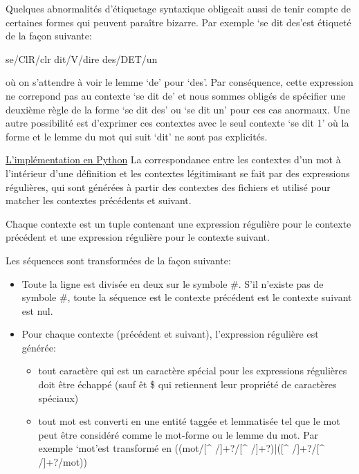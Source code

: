 Quelques abnormalités d'étiquetage syntaxique obligeait aussi de tenir compte de certaines formes qui peuvent paraître bizarre. Par exemple \lq{se dit des}\rq est étiqueté de la façon suivante:

\begin{framed}
se/ClR/clr dit/V/dire des/DET/un
\end{framed}

où on s'attendre à voir le lemme \lq{de}\rq{} pour \lq{des}\rq{}. Par conséquence, cette expression ne correpond pas au contexte \lq{se dit de}\rq{} et nous sommes obligés de spécifier une deuxième règle de la forme \lq{se dit des}\rq{} ou \lq{se dit un}\rq{} pour ces cas anormaux. Une autre possibilité est d'exprimer ces contextes avec le seul contexte \lq{se dit 1}\rq{} où la forme et le lemme du mot qui suit \lq{dit}\rq{} ne sont pas explicités.

\underline{L'implémentation en Python}\newline
La correspondance entre les contextes d'un mot à l'intérieur d'une définition et 
les contextes légitimisant se fait par des expressions régulières, qui sont 
générées à partir des contextes des fichiers et utilisé pour matcher les contextes
précédents et suivant.

Chaque contexte est un tuple contenant une expression régulière pour le contexte 
précédent et une expression régulière pour le contexte suivant.

Les séquences sont transformées de la façon suivante:
\begin{itemize}
    \item{Toute la ligne est divisée en deux sur le symbole \#. S'il n'existe 
    pas de symbole \#, toute la séquence est le contexte précédent est le 
    contexte suivant est nul.}
    \item{Pour chaque contexte (précédent et suivant), l'expression régulière 
    est générée:}
    \begin{itemize}
        \item{tout caractère qui est un caractère spécial pour les expressions 
        régulières doit être échappé (sauf \^ et \$ qui retiennent leur 
	propriété de caractères spéciaux)}
        \item{tout mot est converti en une entité taggée et lemmatisée tel que 
        le mot peut être considéré comme le mot-forme ou le lemme du mot. Par 
	exemple \lq{mot}\rq  est transformé en ((mot/[\string^ /]+?/[\string^ 
	/]+?)|([\string^ /]+?/[\string^ /]+?/mot)) }
    \end{itemize}
\end{itemize}

